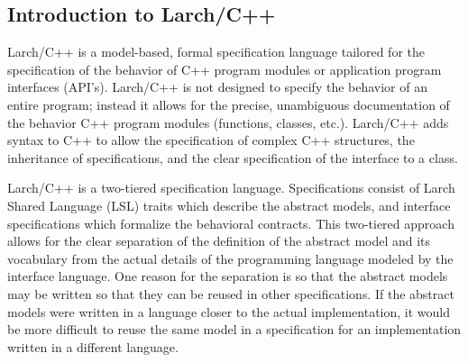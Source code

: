 


\subsection{Introduction to Larch/C++}
\label{lcppintro}
Larch/C++ \cite{Leavens96c} is a model-based, formal specification language tailored for
the specification of the behavior of C++ program modules or
application program interfaces (API's). Larch/C++ is not designed to
specify the 
behavior of an entire program; instead it allows for the precise,
unambiguous documentation of the behavior C++ program modules
(functions, classes, etc.). Larch/C++ adds syntax to C++ to allow the
specification of complex C++ structures, the inheritance of
specifications, and the clear specification of the interface to a
class.

Larch/C++ is a two-tiered specification language. Specifications
consist of Larch Shared Language (LSL) \cite{Guttag-Horning93} traits
which describe the abstract models, and interface specifications which
formalize the behavioral contracts. This two-tiered approach allows
for the clear separation of the definition of the abstract model and its
vocabulary from the actual details of the programming language modeled
by the interface language. One reason for the separation is so that
the abstract models may be written so that they can be reused in other
specifications. If the abstract models were written in a language
closer to the actual implementation, it would be more difficult to
reuse the same model in a specification for an implementation written
in a different language.

